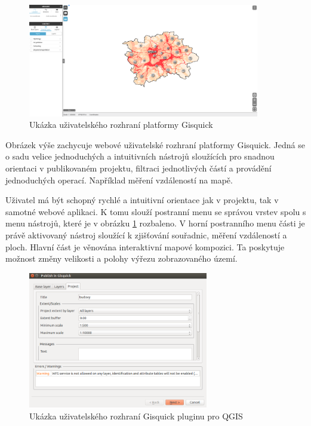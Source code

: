 \begin{figure}[h!]
\centering
\includegraphics[width=0.9\textwidth]{../img/gisquick_ui.png}
\caption{Ukázka uživatelského rozhraní platformy
Gisquick\cite{gisquick-prague}}
\label{fig:gisquick-prague}
\end{figure}

Obrázek výše zachycuje webové uživatelské rozhraní platformy
Gisquick. Jedná se o sadu velice jednoduchých a intuitivních nástrojů
sloužících pro snadnou orientaci v publikovaném projektu, filtraci
jednotlivých částí a provádění jednoduchých operací. Například
měření vzdáleností na mapě.

Uživatel má být schopný rychlé a intuitivní orientace jak v projektu,
tak v samotné webové aplikaci. K tomu slouží postranní menu se správou
vrstev spolu s menu nástrojů, které je v obrázku \ref{fig:gisquick-prague}
rozbaleno. V horní postranního menu části je právě aktivovaný
nástroj sloužící k zjišťování souřadnic, měření vzdáleností
a ploch. Hlavní část je věnována interaktivní mapové kompozici. Ta
poskytuje možnost změny velikosti a polohy výřezu zobrazovaného území.

\begin{figure}[h!]
\centering
\includegraphics[width=0.7\textwidth]{../img/gisquick_plugin.png}
\caption{Ukázka uživatelského rozhraní Gisquick pluginu pro QGIS}
\label{fig:gisquick-plugin}
\end{figure}

